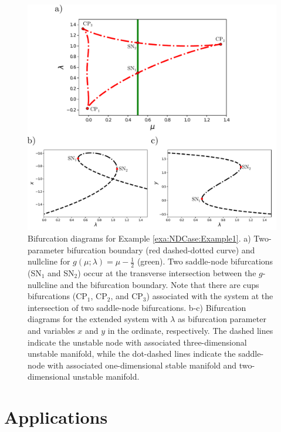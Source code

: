 \documentclass[12pt]{article}
\begin{document}
\begin{figure}
    \begin{center}
        \includegraphics[width=\linewidth]{figures/Example3.pdf}
    \end{center}
    \caption[Bifurcation diagrams for Example \ref{exa:NDCase:Example1}.]{Bifurcation diagrams for Example \ref{exa:NDCase:Example1}. a) Two-parameter bifurcation boundary (red dashed-dotted curve) and nullcline for $g(\mu;\lambda)=\mu-\tfrac{1}{2}$ (green). Two saddle-node bifurcations (SN$_{1}$ and SN$_{2}$) occur at the transverse intersection between the $g$-nullcline and the bifurcation boundary. Note that there are cups bifurcations (CP$_{1}$, CP$_{2}$, and CP$_{3}$) associated with the system at the intersection of two saddle-node bifurcations. b-c) Bifurcation diagrams for the extended system with $\lambda$ as bifurcation parameter and variables $x$ and $y$ in the ordinate, respectively. The dashed lines indicate the unstable node with associated three-dimensional unstable manifold, while the dot-dashed lines indicate the saddle-node with associated one-dimensional stable manifold and two-dimensional unstable manifold.}
    \label{fig:1DCase:Example3}
\end{figure}


\section{Applications}
\label{sec:Applications}
\end{document}
